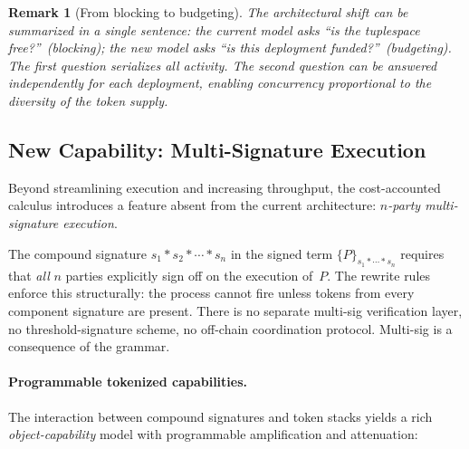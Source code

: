 \documentclass[11pt,a4paper]{article}
\newtheorem{remark}[theorem]{Remark}
\newcommand{\signed}[2]{\{#1\}_{#2}}
\newcommand{\comp}{\mathbin{*}}
\begin{document}
\begin{remark}[From blocking to budgeting]
  The architectural shift can be summarized in a single
  sentence: the current model asks ``is the tuplespace
  free?''\ (blocking); the new model asks ``is this
  deployment funded?''\ (budgeting).  The first question
  serializes all activity.  The second question can be
  answered independently for each deployment, enabling
  concurrency proportional to the diversity of the
  token supply.
\end{remark}

\subsection{New Capability: Multi-Signature Execution}
\label{sec:multisig-motivation}

Beyond streamlining execution and increasing throughput, the
cost-accounted calculus introduces a feature absent from the
current architecture: \emph{$n$-party multi-signature
execution}.

The compound signature $s_1 \comp s_2 \comp \cdots \comp s_n$
in the signed term
$\signed{P}{s_1 \comp \cdots \comp s_n}$
requires that \emph{all} $n$ parties explicitly sign off on the
execution of~$P$.  The rewrite rules enforce this structurally:
the process cannot fire unless tokens from every component
signature are present.  There is no separate multi-sig
verification layer, no threshold-signature scheme, no
off-chain coordination protocol.  Multi-sig is a consequence
of the grammar.

\paragraph{Programmable tokenized capabilities.}
The interaction between compound signatures and token stacks
yields a rich \emph{object-capability} model with
programmable amplification and attenuation:
\end{document}
